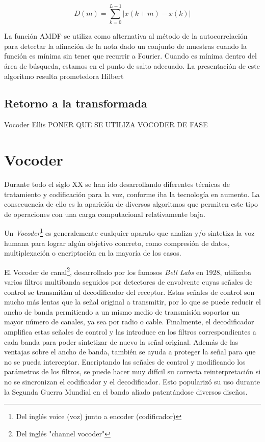 \begin{equation}
\label{eq:amdf}
D(m) =  \sum_{k = 0}^{L - 1}|x(k+m)-x(k)|
\end{equation}

La función AMDF se utiliza como alternativa al método de la autocorrelación para detectar la afinación de la nota dado un conjunto de muestras cuando la función es mínima sin tener que recurrir a Fourier. Cuando es mínima dentro del área de búsqueda, estamos en el punto de salto adecuado.
La presentación de este algoritmo resulta prometedora
Hilbert
\subsection{Retorno a la transformada}
Vocoder
Ellis
PONER QUE SE UTILIZA VOCODER DE FASE
\section{Vocoder}
Durante todo el siglo XX se han ido desarrollando diferentes técnicas de tratamiento y codificación para la voz, conforme iba la tecnología en aumento. La consecuencia de ello es la aparición de diversos algoritmos que permiten este tipo de operaciones con una carga computacional relativamente baja. 

Un \emph{Vocoder}\footnote{Del inglés voice (voz) junto a encoder (codificador)} es generalemente cualquier aparato que analiza y/o sintetiza la voz humana para lograr  algún objetivo concreto, como compresión de datos, multiplexación o encriptación en la mayoría de los casos.

El Vocoder de canal\footnote{Del inglés "channel vocoder"}, desarrollado por los famosos \emph{Bell Labs} en 1928, utilizaba varios filtros multibanda seguidos por detectores de envolvente cuyas señales de control se transmitían al decodificador del receptor. Estas señales de control son mucho más lentas que la señal original a transmitir, por lo que se puede reducir el ancho de banda permitiendo a un mismo medio de transmisión soportar un mayor número de canales, ya sea por radio o cable. Finalmente, el decodificador amplifica estas señales de control y las introduce en los filtros correspondientes a cada banda para poder sintetizar de nuevo la señal original. Además de las ventajas sobre el ancho de banda, también se ayuda a proteger la señal para que no se pueda interceptar. Encriptando las señales de control y modificando los parámetros de los filtros, se puede hacer muy difícil su correcta reinterpretación si no se sincronizan el codificador y el decodificador. Esto popularizó su uso durante la Segunda Guerra Mundial en el bando aliado patentándose diversos diseños.

